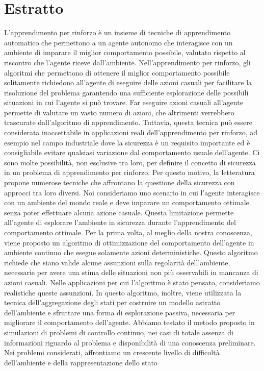 \newcommand{\estrattoname}{Estratto}
\addcontentsline{toc}{chapter}{\estrattoname}

\begingroup
\let\clearpage\relax
\let\cleardoublepage\relax
\let\cleardoublepage\relax

\chapter*{Estratto}
\sloppy L'apprendimento per rinforzo è un insieme di tecniche di apprendimento automatico che permettono a un agente autonomo che interagisce con un ambiente di imparare il miglior comportamento possibile, valutato rispetto al riscontro che l'agente riceve dall'ambiente. Nell'apprendimento per rinforzo, gli algoritmi che permettono di ottenere il miglior comportamento possibile solitamente richiedono all'agente di eseguire delle azioni casuali per facilitare la risoluzione del problema garantendo una sufficiente esplorazione delle possibili situazioni in cui l'agente si può trovare. Far eseguire azioni casuali all'agente permette di valutare un vasto numero di azioni, che altrimenti verrebbero trascurate dall'algoritmo di apprendimento. Tuttavia, questa tecnica può essere considerata inaccettabile in applicazioni reali dell'apprendimento per rinforzo, ad esempio nel campo industriale dove la sicurezza è un requisito importante ed è consigliabile evitare qualsiasi variazione dal comportamento usuale dell'agente. Ci sono molte possibilità, non esclusive tra loro, per definire il concetto di sicurezza in un problema di apprendimento per rinforzo. Per questo motivo, la letteratura propone numerose tecniche che affrontano la questione della sicurezza con approcci tra loro diversi. Noi consideriamo uno scenario in cui l'agente interagisce con un ambiente del mondo reale e deve imparare un comportamento ottimale senza poter effettuare alcuna azione casuale. Questa limitazione permette all'agente di esplorare l'ambiente in sicurezza durante l'apprendimento del comportamento ottimale. Per la prima volta, al meglio della nostra conoscenza, viene proposto un algoritmo di ottimizzazione del comportamento dell'agente in ambiente continuo che esegue solamente azioni deterministiche. Questo algoritmo richiede che siano valide alcune assunzioni sulla regolarità dell'ambiente, necessarie per avere una stima delle situazioni non più osservabili in mancanza di azioni casuali. Nelle applicazioni per cui l'algoritmo è stato pensato, consideriamo realistiche queste assunzioni. In questo algoritmo, inoltre, viene utilizzata la tecnica dell'aggregazione degli stati per costruire un modello astratto dell'ambiente e sfruttare una forma di esplorazione passiva, necessaria per migliorare il comportamento dell'agente. Abbiamo testato il metodo proposto in simulazioni di problemi di controllo continuo, nei casi di totale assenza di informazioni riguardo al problema e disponibilità di una conoscenza preliminare. Nei problemi considerati, affrontiamo un crescente livello di difficoltà dell'ambiente e della rappresentazione dello stato 